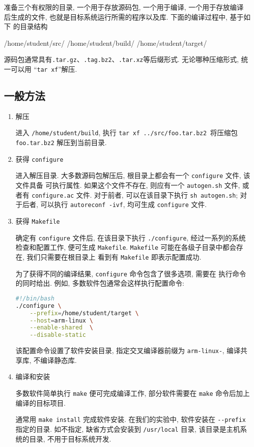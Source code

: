 准备三个有权限的目录, 一个用于存放源码包, 一个用于编译, 一个用于存放编译
后生成的文件, 也就是目标系统运行所需的程序以及库. 下面的编译过程中, 基于如下
的目录结构

\begin{blockcode}
    /home/student/src/
    /home/student/build/
    /home/student/target/
\end{blockcode}

源码包通常具有\verb|.tar.gz|、\verb|.tag.bz2|、\verb|.tar.xz|等后缀形式.
无论哪种压缩形式, 统一可以用 ``\verb|tar xf|''解压.

\subsection{一般方法}
\begin{enumerate}
    \item 解压

        进入 \verb|/home/student/build|, 执行
        \verb|tar xf ../src/foo.tar.bz2 |将压缩包 \verb|foo.tar.bz2|
        解压到当前目录.
    \item 获得 \verb|configure|

        进入解压目录.
        大多数源码包解压后, 根目录上都会有一个 \verb|configure| 文件,
        该文件具备
        可执行属性. 如果这个文件不存在, 则应有一个 \verb|autogen.sh| 文件,
        或者有 \verb|configure.ac| 文件. 对于前者, 可以在该目录下执行
        \verb|sh autogen.sh|; 对于后者, 可以执行 \verb|autoreconf -ivf|,
        均可生成 \verb|configure| 文件.
    \item 获得 \verb|Makefile|

        确定有 \verb|configure| 文件后, 在该目录下执行 \verb|./configure|,
        经过一系列的系统检查和配置工作, 便可生成 \verb|Makefile|.
        \verb|Makefile| 可能在各级子目录中都会存在, 我们只需要在根目录上
        看到有 \verb|Makefile| 即表示配置成功.

        为了获得不同的编译结果, \verb|configure| 命令包含了很多选项, 需要在
        执行命令的同时给出. 例如, 多数软件包通常会这样执行配置命令:

\begin{lstlisting}[language=bash,firstline=2,deletekeywords=enable,
columns=flexible]
#!/bin/bash
./configure \
    --prefix=/home/student/target \
    --host=arm-linux \
    --enable-shared  \
    --disable-static
\end{lstlisting}

该配置命令设置了软件安装目录, 指定交叉编译器前缀为 \verb|arm-linux-|,
编译共享库, 不编译静态库.

    \item 编译和安装

        多数软件简单执行 \verb|make| 便可完成编译工作, 部分软件需要在
        \verb|make| 命令后加上编译的目标项目.

        通常用 \verb|make install| 完成软件安装. 在我们的实验中, 软件安装在
        \verb|--prefix| 指定的目录. 如不指定, 缺省方式会安装到
        \verb|/usr/local| 目录, 该目录是主机系统的目录, 不用于目标系统开发.

\end{enumerate}

